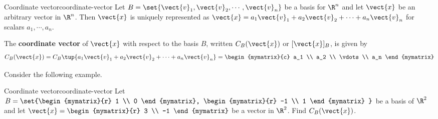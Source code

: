 \begin{definition}{Coordinate vector}{coordinate-vector}
Let $B = \set{\vect{v}_1, \vect{v}_2, \cdots, \vect{v}_n }$
be a basis for $\R^n$ and let $\vect{x}$ be an arbitrary
vector in $\R^n$. Then $\vect{x}$ is uniquely represented as
$\vect{x} = a_1\vect{v}_1 +
a_2\vect{v}_2 + \cdots + a_n\vect{v}_n$ for scalars $a_1, \cdots,
a_n$. 

The  \textbf{coordinate vector} of $\vect{x}$ with respect to the
basis $B$, written $C_B(\vect{x})$ or  $[\vect{x}]_B$,  is given by
\[
C_B(\vect{x}) =  C_B \tup{a_1\vect{v}_1 + a_2\vect{v}_2 + \cdots + a_n\vect{v}_n } = \begin{mymatrix}{c}
a_1 \\
a_2 \\
\vdots \\
a_n
\end{mymatrix}
\] 
\end{definition}

Consider the following example.

\begin{example}{Coordinate vector}{coordinate-vector}
Let $B = \set{\begin{mymatrix}{r}
1 \\
0 
\end{mymatrix}, \begin{mymatrix}{r}
-1 \\
1
\end{mymatrix} }$ be a basis of $\R^2$ and let $\vect{x} = \begin{mymatrix}{r}
3 \\
-1
\end{mymatrix}$ be a vector in $\R^2$. Find $C_B(\vect{x})$. 
\end{example}

